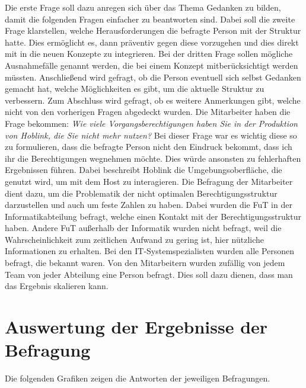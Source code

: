 Die erste Frage soll dazu anregen sich über das Thema Gedanken zu bilden, damit die folgenden Fragen einfacher zu beantworten sind.
Dabei soll die zweite Frage klarstellen, welche Herausforderungen die befragte Person mit der Struktur hatte.
Dies ermöglicht es, dann präventiv gegen diese vorzugehen und dies direkt mit in die neuen Konzepte zu integrieren.
Bei der dritten Frage sollen mögliche Ausnahmefälle genannt werden, die bei einem Konzept mitberücksichtigt werden müssten.
Anschließend wird gefragt, ob die Person eventuell sich selbst Gedanken gemacht hat, welche Möglichkeiten es gibt, um die aktuelle Struktur zu verbessern.
Zum Abschluss wird gefragt, ob es weitere Anmerkungen gibt, welche nicht von den vorherigen Fragen abgedeckt wurden.
\newline
\newline
Die Mitarbeiter haben die Frage bekommen:
\newline
\newline
\textit{Wie viele Vorgangsberechtigungen haben Sie in der Produktion von Hoblink, die Sie nicht mehr nutzen?}
\newline
\newline
Bei dieser Frage war es wichtig diese so zu formulieren, dass die befragte Person nicht den Eindruck bekommt, dass ich ihr die Berechtigungen wegnehmen möchte.
Dies würde ansonsten zu fehlerhaften Ergebnissen führen.
Dabei beschreibt Hoblink die Umgebungsoberfläche, die genutzt wird, um mit dem Host zu interagieren.
Die Befragung der Mitarbeiter dient dazu, um die Problematik der nicht optimalen Berechtigungsstruktur darzustellen und auch um feste Zahlen zu haben.
\newline
\newline
Dabei wurden die \ac{FuT} in der Informatikabteilung befragt, welche einen Kontakt mit der Berechtigungsstruktur haben.
Andere \ac{FuT} außerhalb der Informatik wurden nicht befragt, weil die Wahrscheinlichkeit zum zeitlichen Aufwand zu gering ist, hier nützliche Informationen zu erhalten.
Bei den IT-Systemspezialisten wurden alle Personen befragt, die bekannt waren.
Von den Mitarbeitern wurden zufällig von jedem Team von jeder Abteilung eine Person befragt.
Dies soll dazu dienen, dass man das Ergebnis skalieren kann.
\newpage
\section{Auswertung der Ergebnisse der Befragung}
\label{sec:Auswertung}

Die folgenden Grafiken zeigen die Antworten der jeweiligen Befragungen.

